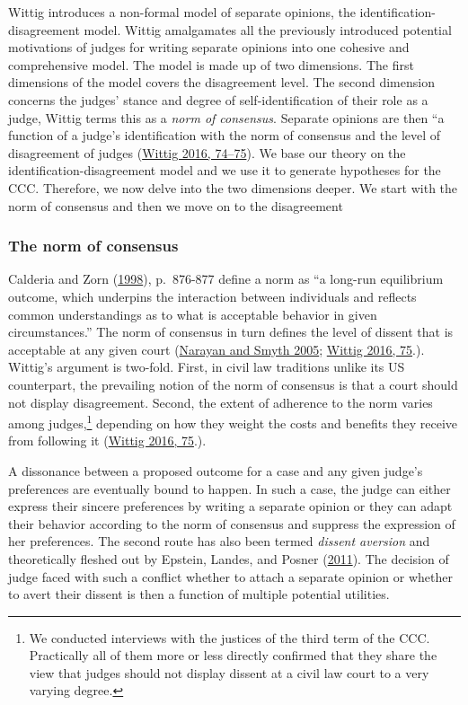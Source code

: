 \documentclass[
  11pt,
]{article}
\begin{document}
Wittig introduces a non-formal model of separate opinions, the
identification-disagreement model. Wittig amalgamates all the previously
introduced potential motivations of judges for writing separate opinions
into one cohesive and comprehensive model. The model is made up of two
dimensions. The first dimensions of the model covers the disagreement
level. The second dimension concerns the judges' stance and degree of
self-identification of their role as a judge, Wittig terms this as a
\emph{norm of consensus}. Separate opinions are then ``a function of a
judge's identification with the norm of consensus and the level of
disagreement of judges
(\protect\hyperlink{ref-wittigOccurrenceSeparateOpinions2016}{Wittig
2016, 74--75}). We base our theory on the identification-disagreement
model and we use it to generate hypotheses for the CCC. Therefore, we
now delve into the two dimensions deeper. We start with the norm of
consensus and then we move on to the disagreement

\hypertarget{the-norm-of-consensus}{%
\subsubsection{The norm of consensus}\label{the-norm-of-consensus}}

Calderia and Zorn
(\protect\hyperlink{ref-calderiaTimeConsensualNorms1998}{1998}),
p.~876-877 define a norm as ``a long-run equilibrium outcome, which
underpins the interaction between individuals and reflects common
understandings as to what is acceptable behavior in given
circumstances.'' The norm of consensus in turn defines the level of
dissent that is acceptable at any given court
(\protect\hyperlink{ref-narayanConsensualNormHigh2005}{Narayan and Smyth
2005};
\protect\hyperlink{ref-wittigOccurrenceSeparateOpinions2016}{Wittig
2016, 75}.). Wittig's argument is two-fold. First, in civil law
traditions unlike its US counterpart, the prevailing notion of the norm
of consensus is that a court should not display disagreement. Second,
the extent of adherence to the norm varies among judges,\footnote{We
  conducted interviews with the justices of the third term of the CCC.
  Practically all of them more or less directly confirmed that they
  share the view that judges should not display dissent at a civil law
  court to a very varying degree.} depending on how they weight the
costs and benefits they receive from following it
(\protect\hyperlink{ref-wittigOccurrenceSeparateOpinions2016}{Wittig
2016, 75}.).

A dissonance between a proposed outcome for a case and any given judge's
preferences are eventually bound to happen. In such a case, the judge
can either express their sincere preferences by writing a separate
opinion or they can adapt their behavior according to the norm of
consensus and suppress the expression of her preferences. The second
route has also been termed \emph{dissent aversion} and theoretically
fleshed out by Epstein, Landes, and Posner
(\protect\hyperlink{ref-epsteinWhyWhenJudges2011}{2011}). The decision
of judge faced with such a conflict whether to attach a separate opinion
or whether to avert their dissent is then a function of multiple
potential utilities.
\end{document}
